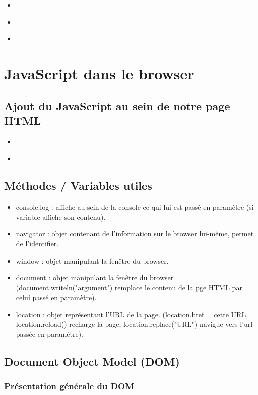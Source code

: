 \documentclass{article}[12pt]
\newcommand{\JavaScript}[2]{
	\begin{itemize}
		\item[]
	\end{itemize}
}
\begin{document}
\JavaScript{decla_pseudo_classe}{Exemple de déclaration d'une pseudo classe}

\JavaScript{util_pseudo_classe}{Exemple d'utilisation d'une pseudo classe}

\JavaScript{heritage}{Exemple d'utilisation de l'héritage sur une pseudo classe}

\section{JavaScript dans le browser}

\subsection{Ajout du JavaScript au sein de notre page HTML}

\JavaScript{ajoutJS_direct}{Directement au sein de la page HTML}

\JavaScript{ajoutJS_indirect}{Au sein d'un fichier séparé du reste de la page HTML}

\subsection{Méthodes / Variables utiles}

\begin{itemize}
	\item console.log : affiche au sein de la console ce qui lui est passé en paramètre (si variable affiche son contenu).
    \item navigator : objet contenant de l'information sur le browser lui-même, permet de l'identifier.
    \item window : objet manipulant la fenêtre du browser.
    \item document : objet manipulant la fenêtre du browser (document.writeln("argument") remplace le contenu de la pge HTML par celui passé en paramètre).
    \item location : objet représentant l'URL de la page.
    (location.href = cette URL, location.reload() recharge la page, location.replace("URL") navigue vers l'url passée en paramètre).
\end{itemize}
\newpage
\subsection{Document Object Model (DOM)}

\subsubsection{Présentation générale du DOM}
\end{document}
